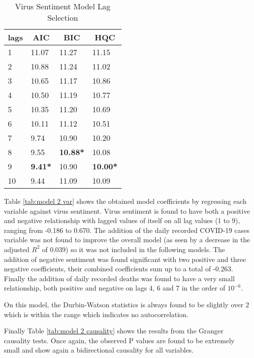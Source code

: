 \begin{table}[H]
\centering
\begin{tabular}{@{}llll@{}}
\toprule
\multicolumn{1}{c}{\textbf{lags}} & \multicolumn{1}{c}{\textbf{AIC}} & \multicolumn{1}{c}{\textbf{BIC}} & \multicolumn{1}{c}{\textbf{HQC}} \\ \midrule
1 & 11.07 & 11.27 & 11.15 \\
2 & 10.88 & 11.24 & 11.02 \\
3 & 10.65 & 11.17 & 10.86 \\
4 & 10.50 & 11.19 & 10.77 \\
5 & 10.35 & 11.20 & 10.69 \\
6 & 10.11 & 11.12 & 10.51 \\
7 & 9.74 & 10.90 & 10.20 \\
8 & 9.55 & \textbf{10.88*} & 10.08 \\
9 & \textbf{9.41*} & 10.90 & \textbf{10.00*} \\
10 & 9.44 & 11.09 & 10.09 \\ \bottomrule
\end{tabular}
\caption{Virus Sentiment Model Lag Selection}
\label{tab:model 2 lag}
\end{table}


Table \ref{tab:model 2 var} shows the obtained model coefficients by regressing each variable against virus sentiment. Virus sentiment is found to have both a positive and negative relationship with lagged values of itself on all lag values (1 to 9), ranging from -0.186 to 0.670. The addition of the daily recorded COVID-19 cases variable was not found to improve the overall model (as seen by a decrease in the adjusted $R^2$ of 0.039) so it was not included in the following models.  The addition of negative sentiment was found significant with two positive and three negative coefficients, their combined coefficients sum up to a total of -0.263. Finally the addition of daily recorded deaths was found to have a very small relationship, both positive and negative on lags 4, 6 and 7 in the order of $10^{-6}$.

On this model, the Durbin-Watson statistics is always found to be slightly over 2 which is within the range which indicates no autocorrelation.

Finally Table \ref{tab:model 2 causality} shows the results from the Granger causality tests. Once again, the observed P values are found to be extremely small and show again a bidirectional causality for all variables.

